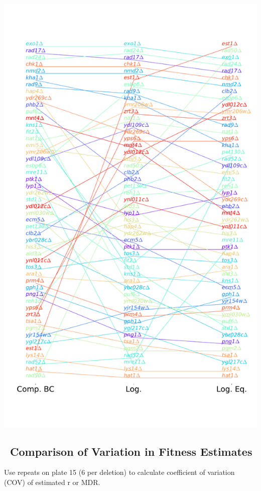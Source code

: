 \begin{multicols}{2}
\graphicspath{{images/correlation/}}
\begin{Figure}
  \centering
  \includegraphics[width=\linewidth]{r_correlations}
  \label{fig:r_ranking}
\end{Figure}

\subsection{\thesubsection~Comparison of Variation in Fitness Estimates}

Use repeats on plate 15 (6 per deletion) to calculate coefficient of
variation (COV) of estimated r or MDR.

\end{multicols}
